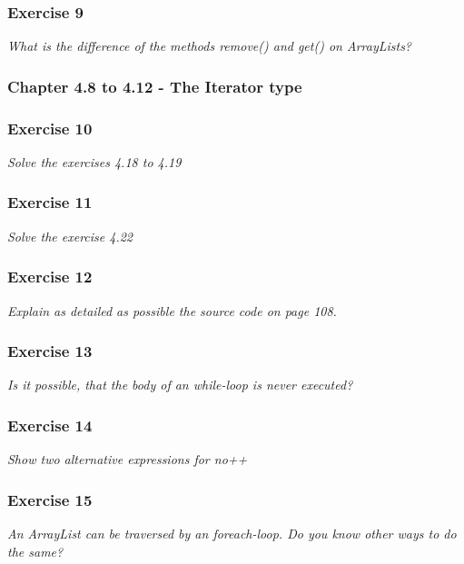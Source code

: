\subsubsection*{Exercise 9}
\textit{What is the difference of the methods remove() and get() on
ArrayLists?}\\

\subsubsection{Chapter 4.8 to 4.12 - The Iterator type}

\subsubsection*{Exercise 10}
\textit{Solve the exercises 4.18 to 4.19}\\

\subsubsection*{Exercise 11}
\textit{Solve the exercise 4.22}\\

\subsubsection*{Exercise 12}
\textit{Explain as detailed as possible the source code on page 108.}\\

\subsubsection*{Exercise 13}
\textit{Is it possible, that the body of an while-loop is never executed?}\\

\subsubsection*{Exercise 14}
\textit{Show two alternative expressions for no++}\\

\subsubsection*{Exercise 15}
\textit{An ArrayList can be traversed by an foreach-loop. Do you know other
ways to do the same?}\\

